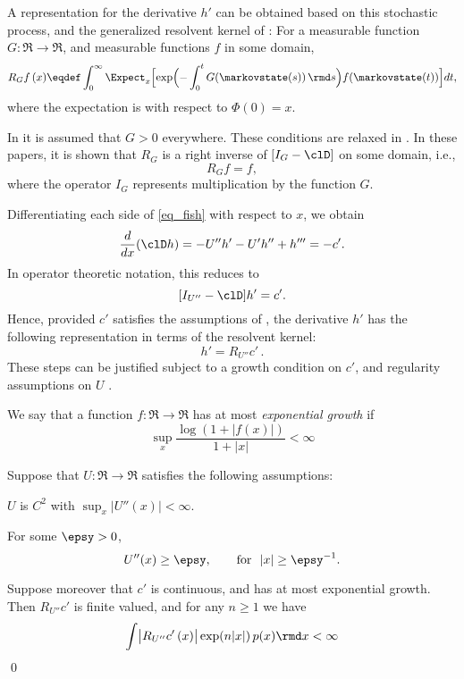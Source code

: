 A representation for the derivative $h'$ can be obtained based on this stochastic process, and  the generalized resolvent kernel of \cite{nev72,meytwe93e,devkonmey16a}: For a measurable function $G\colon\Re\to\Re$, and measurable functions $f$ in some domain,
\begin{equation}
R_G f\, (x) \eqdef \int_0^\infty \Expect_x\Bigl[ \exp\Bigl(-\int_0^t G(\markovstate(s))\, \rmd s \Bigr) f(\markovstate(t))\Bigr] dt,
\label{e:Neveu}
\end{equation}
where the expectation is with respect to $\Phi(0)=x$.

In  \cite{nev72,meytwe93e} it is assumed that $G>0$ everywhere. These conditions are relaxed in \cite{konmey03a,devkonmey16a}. In these papers, it is shown that $R_G$ is a right inverse of $[I_G -\clD]$ on some domain, i.e.,
\begin{equation*}
[I_G-\clD]R_G f = f,
\end{equation*}
where the operator $I_G$ represents multiplication by the function $G$.

Differentiating each side of \eqref{eq_fish} with respect to $x$, we obtain
\[
\frac{d}{dx}  (\clD h) = -U'' h' - U' h '' +   h '''  =   - c'.
\]
In operator theoretic notation, this reduces to
\[
[I_{U''} -\clD] h' = c'.
\]
Hence, provided $c'$ satisfies the assumptions of \cite{devkonmey16b}, the derivative $h'$ has the following representation in terms of the resolvent kernel:
\begin{equation}
h' = R_{U''} c'\, .
\label{e:gradhrep}
\end{equation}
These steps can be justified subject to a growth condition on $c'$,  and  regularity assumptions on $U$  \cite{devkonmey16b}.

We say that a function $f\colon\Re\to\Re$ has at most \textit{exponential growth} if
\[
\sup_x  \frac{ \log(1+|f(x)|)}{1+|x|}  <\infty
\]

\begin{proposition}
	\label{t:grad_h_LE}
	Suppose that $U\colon\Re\to\Re$ satisfies the following assumptions:
	\begin{romannum}
		\item $U$ is $C^2$ with $\sup_x |U''(x)| <\infty$.
		\item  For some $\epsy>0$,
		\[
		U''(x) \ge \epsy,\qquad \text{for} \ \ |x|\ge \epsy^{-1}.
		\]
	\end{romannum}
	Suppose moreover that $c'$ is continuous, and has at most exponential growth.
	Then $ R_{U''} c'$ is finite valued, and for any $n\ge 1$ we have
	\[
	\int   \bigl|  R_{U''} c'\, (x) \bigr|\exp(n |x|)  \, p(x) \rmd x  <\infty
	\]
	\qed
\end{proposition}





